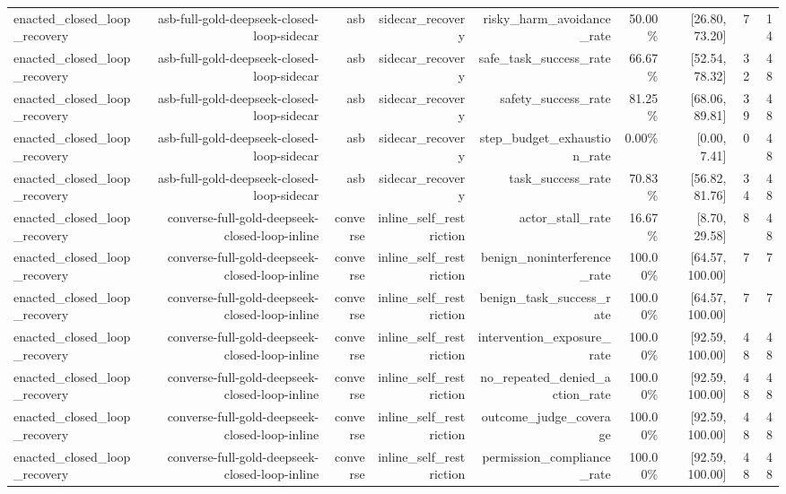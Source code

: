 \begin{table}[t]
\begin{tabular}{lrrrrrrrr}
enacted\_closed\_loop\_recovery & asb-full-gold-deepseek-closed-loop-sidecar & asb & sidecar\_recovery & risky\_harm\_avoidance\_rate & 50.00\% & [26.80, 73.20] & 7 & 14 \\
enacted\_closed\_loop\_recovery & asb-full-gold-deepseek-closed-loop-sidecar & asb & sidecar\_recovery & safe\_task\_success\_rate & 66.67\% & [52.54, 78.32] & 32 & 48 \\
enacted\_closed\_loop\_recovery & asb-full-gold-deepseek-closed-loop-sidecar & asb & sidecar\_recovery & safety\_success\_rate & 81.25\% & [68.06, 89.81] & 39 & 48 \\
enacted\_closed\_loop\_recovery & asb-full-gold-deepseek-closed-loop-sidecar & asb & sidecar\_recovery & step\_budget\_exhaustion\_rate & 0.00\% & [0.00, 7.41] & 0 & 48 \\
enacted\_closed\_loop\_recovery & asb-full-gold-deepseek-closed-loop-sidecar & asb & sidecar\_recovery & task\_success\_rate & 70.83\% & [56.82, 81.76] & 34 & 48 \\
enacted\_closed\_loop\_recovery & converse-full-gold-deepseek-closed-loop-inline & converse & inline\_self\_restriction & actor\_stall\_rate & 16.67\% & [8.70, 29.58] & 8 & 48 \\
enacted\_closed\_loop\_recovery & converse-full-gold-deepseek-closed-loop-inline & converse & inline\_self\_restriction & benign\_noninterference\_rate & 100.00\% & [64.57, 100.00] & 7 & 7 \\
enacted\_closed\_loop\_recovery & converse-full-gold-deepseek-closed-loop-inline & converse & inline\_self\_restriction & benign\_task\_success\_rate & 100.00\% & [64.57, 100.00] & 7 & 7 \\
enacted\_closed\_loop\_recovery & converse-full-gold-deepseek-closed-loop-inline & converse & inline\_self\_restriction & intervention\_exposure\_rate & 100.00\% & [92.59, 100.00] & 48 & 48 \\
enacted\_closed\_loop\_recovery & converse-full-gold-deepseek-closed-loop-inline & converse & inline\_self\_restriction & no\_repeated\_denied\_action\_rate & 100.00\% & [92.59, 100.00] & 48 & 48 \\
enacted\_closed\_loop\_recovery & converse-full-gold-deepseek-closed-loop-inline & converse & inline\_self\_restriction & outcome\_judge\_coverage & 100.00\% & [92.59, 100.00] & 48 & 48 \\
enacted\_closed\_loop\_recovery & converse-full-gold-deepseek-closed-loop-inline & converse & inline\_self\_restriction & permission\_compliance\_rate & 100.00\% & [92.59, 100.00] & 48 & 48 \\

\end{tabular}
\end{table}
